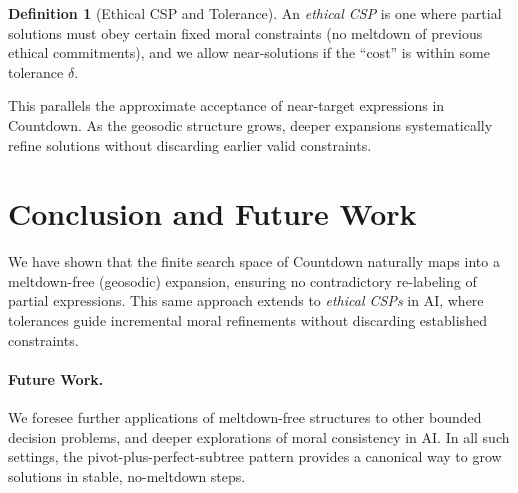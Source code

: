 \documentclass[11pt]{article}
\theoremstyle{definition}
\newtheorem{definition}[theorem]{Definition}
\theoremstyle{remark}
\begin{document}
\begin{definition}[Ethical CSP and Tolerance]
An \emph{ethical CSP} is one where partial solutions must obey certain
fixed moral constraints (no meltdown of previous ethical commitments),
and we allow near-solutions if the ``cost'' is within some tolerance $\delta$.
\end{definition}

This parallels the approximate acceptance of near-target expressions in
Countdown. As the geosodic structure grows, deeper expansions systematically
refine solutions without discarding earlier valid constraints.
 \section{Conclusion and Future Work}
\label{sec:conclusion}

We have shown that the finite search space of Countdown naturally maps into
a meltdown-free (geosodic) expansion, ensuring no contradictory re-labeling
of partial expressions. This same approach extends to \emph{ethical CSPs} in
AI, where tolerances guide incremental moral refinements without discarding
established constraints.

\paragraph{Future Work.} We foresee further applications of meltdown-free
structures to other bounded decision problems, and deeper explorations of
moral consistency in AI. In all such settings, the pivot-plus-perfect-subtree
pattern provides a canonical way to grow solutions in stable, no-meltdown steps.
 


\end{document}
